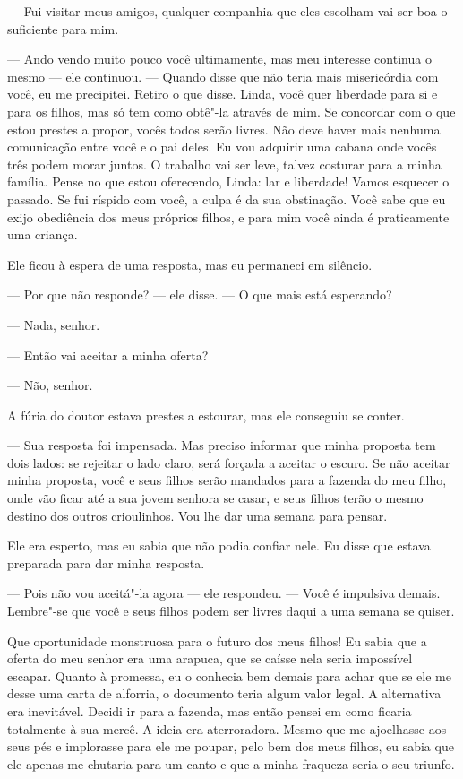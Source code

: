 --- Fui visitar meus amigos, qualquer companhia que eles escolham vai
ser boa o suficiente para mim.

--- Ando vendo muito pouco você
ultimamente, mas meu interesse continua o mesmo --- ele continuou. ---
Quando disse que não teria mais misericórdia com você, eu me precipitei.
Retiro o que disse. Linda, você quer liberdade para si e para os filhos,
mas só tem como obtê"-la através de mim. Se concordar com o que estou
prestes a propor, vocês todos serão livres. Não deve haver mais nenhuma
comunicação entre você e o pai deles. Eu vou adquirir uma cabana onde
vocês três podem morar juntos. O trabalho vai ser leve, talvez costurar
para a minha família. Pense no que estou oferecendo, Linda: lar e
liberdade! Vamos esquecer o passado. Se fui ríspido com você, a culpa é
da sua obstinação. Você sabe que eu exijo obediência dos meus próprios
filhos, e para mim você ainda é praticamente uma criança.

Ele ficou à espera de uma resposta, mas
eu permaneci em silêncio.

--- Por que não responde? --- ele disse. --- O que mais está esperando?

--- Nada, senhor.

--- Então vai aceitar a minha oferta?

--- Não, senhor.

A fúria do doutor estava prestes a
estourar, mas ele conseguiu se conter.

--- Sua resposta foi impensada. Mas preciso informar que minha proposta
tem dois lados: se rejeitar o lado claro, será forçada a aceitar o
escuro. Se não aceitar minha proposta, você e seus filhos serão mandados
para a fazenda do meu filho, onde vão ficar até a sua jovem senhora se
casar, e seus filhos terão o mesmo destino dos outros crioulinhos. Vou
lhe dar uma semana para pensar.

Ele era esperto, mas eu sabia que não
podia confiar nele. Eu disse que estava preparada para dar minha
resposta.

--- Pois não vou aceitá"-la agora ---
ele respondeu. --- Você é impulsiva demais. Lembre"-se que você e seus
filhos podem ser livres daqui a uma semana se quiser.

Que oportunidade monstruosa para o
futuro dos meus filhos! Eu sabia que a oferta do meu senhor era uma
arapuca, que se caísse nela seria impossível escapar. Quanto à promessa,
eu o conhecia bem demais para achar que se ele me desse uma carta de
alforria, o documento teria algum valor legal. A alternativa era
inevitável. Decidi ir para a fazenda, mas então pensei em como ficaria
totalmente à sua mercê. A ideia era aterroradora. Mesmo que me
ajoelhasse aos seus pés e implorasse para ele me poupar, pelo bem dos
meus filhos, eu sabia que ele apenas me chutaria para um canto e que a
minha fraqueza seria o seu triunfo.

